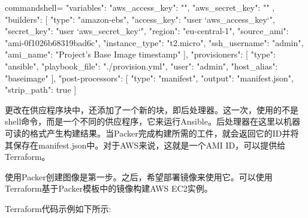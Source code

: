 \begin{tcblisting}{commandshell={}}
{
  "variables": {
    "aws_access_key": "",
    "aws_secret_key": ""
  },
  "builders": [{
    "type": "amazon-ebs",
    "access_key": "{{user `aws_access_key`}}",
    "secret_key": "{{user `aws_secret_key`}}",
    "region": "eu-central-1",
    "source_ami": "ami-0f1026b68319bad6c",
    "instance_type": "t2.micro",
    "ssh_username": "admin",
    "ami_name": "Project's Base Image {{timestamp}}"
  }],
  "provisioners": [{
    "type": "ansible",
    "playbook_file": "./provision.yml",
    "user": "admin",
    "host_alias": "baseimage"
  }],
  "post-processors": [{
    "type": "manifest",
    "output": "manifest.json",
    "strip_path": true
  }]
}
\end{tcblisting}

更改在供应程序块中，还添加了一个新的块，即后处理器。这一次，使用的不是shell命令，而是一个不同的供应程序，它来运行Ansible。后处理器在这里以机器可读的格式产生构建结果。当Packer完成构建所需的工件，就会返回它的ID并将其保存在manifest.json中。对于AWS来说，这就是一个AMI ID，可以提供给Terraform。


使用Packer创建图像是第一步。之后，希望部署镜像来使用它。可以使用Terraform基于Packer模板中的镜像构建AWS EC2实例。

Terraform代码示例如下所示:

